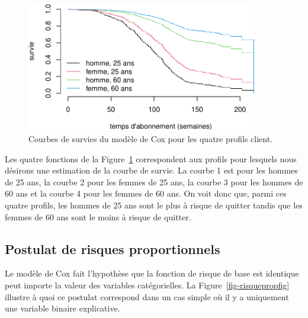 \documentclass[
  11pt,
  letterpaper,
]{book}
\theoremstyle{definition}
\theoremstyle{remark}
\begin{document}
\begin{figure}[ht!]

{\centering \includegraphics[width=0.9\textwidth,height=\textheight]{./06-survie_files/figure-pdf/fig-courbes-survie-1.pdf}

}

\caption{\label{fig-courbes-survie}Courbes de survies du modèle de Cox
pour les quatre profils client.}

\end{figure}

Les quatre fonctions de la Figure~\ref{fig-courbes-survie} correspondent
aux profils pour lesquels nous désirons une estimation de la courbe de
survie. La courbe 1 est pour les hommes de 25 ans, la courbe 2 pour les
femmes de 25 ans, la courbe 3 pour les hommes de 60 ans et la courbe 4
pour les femmes de 60 ans. On voit donc que, parmi ces quatre profils,
les hommes de 25 ans sont le plus à risque de quitter tandis que les
femmes de 60 ans sont le moins à risque de quitter.

\hypertarget{postulat-de-risques-proportionnels}{%
\subsection{Postulat de risques
proportionnels}\label{postulat-de-risques-proportionnels}}

Le modèle de Cox fait l'hypothèse que la fonction de risque de base est
identique peut importe la valeur des variables catégorielles. La
Figure~\ref{fig-risquepropfig} illustre à quoi ce postulat correspond
dans un cas simple où il y a uniquement une variable binaire
explicative.
\end{document}
